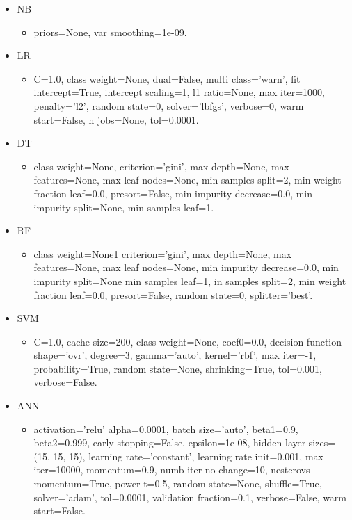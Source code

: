 \begin{itemize}
    \item NB
    \begin{itemize}
        \item priors=None, var smoothing=1e-09.
    \end{itemize}
    \item LR
    \begin{itemize}
        \item C=1.0, class weight=None, dual=False, multi class='warn', fit intercept=True,
intercept scaling=1, 
l1 ratio=None, 
max iter=1000,                  
penalty='l2',                  
random state=0, 
solver='lbfgs', 
verbose=0,                
warm start=False,
n jobs=None,
tol=0.0001.
    \end{itemize}
    \item DT
    \begin{itemize}
        \item class weight=None, 
criterion='gini', 
max depth=None,                      
max features=None, 
max leaf nodes=None,
min samples split=2,                       
min weight fraction leaf=0.0, 
presort=False,
min impurity decrease=0.0, 
min impurity split=None,
min samples leaf=1.
    \end{itemize}
    \item RF
    \begin{itemize}
        \item  class weight=None1
criterion='gini', 
max depth=None,
max features=None, 
max leaf nodes=None,                      
min impurity decrease=0.0, 
min impurity split=None                       
min samples leaf=1,
in samples split=2,                      
min weight fraction leaf=0.0,
presort=False,
random state=0, splitter='best'.
    \end{itemize}
    \item SVM
        \begin{itemize}
        \item C=1.0, 
cache size=200,
class weight=None, 
coef0=0.0,
decision function shape='ovr', 
degree=3, 
gamma='auto', 
kernel='rbf',
max iter=-1, 
probability=True, 
random state=None, 
shrinking=True, 
tol=0.001,
verbose=False.

    \end{itemize}
    \item ANN
    \begin{itemize}
        \item activation='relu'
alpha=0.0001,
batch size='auto', 
beta1=0.9,
beta2=0.999, 
early stopping=False, 
epsilon=1e-08,
hidden layer sizes=(15, 15, 15), 
learning rate='constant',
learning rate init=0.001,
max iter=10000, momentum=0.9,
numb iter no change=10, 
nesterovs momentum=True,
power t=0.5,
random state=None,
shuffle=True, 
solver='adam', 
tol=0.0001,
validation fraction=0.1, 
verbose=False,
warm start=False.
    \end{itemize}
\end{itemize}
